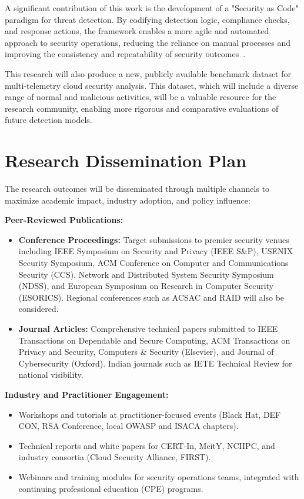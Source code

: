 A significant contribution of this work is the development of a "Security as Code" paradigm for threat detection. By codifying detection logic, compliance checks, and response actions, the framework enables a more agile and automated approach to security operations, reducing the reliance on manual processes and improving the consistency and repeatability of security outcomes~\cite{security_as_code_2024}.

This research will also produce a new, publicly available benchmark dataset for multi-telemetry cloud security analysis. This dataset, which will include a diverse range of normal and malicious activities, will be a valuable resource for the research community, enabling more rigorous and comparative evaluations of future detection models.

\section{Research Dissemination Plan}\label{sec:intro-dissemination}
The research outcomes will be disseminated through multiple channels to maximize academic impact, industry adoption, and policy influence:

\textbf{Peer-Reviewed Publications:}
\begin{itemize}
    \item \textbf{Conference Proceedings:} Target submissions to premier security venues including IEEE Symposium on Security and Privacy (IEEE S\&P), USENIX Security Symposium, ACM Conference on Computer and Communications Security (CCS), Network and Distributed System Security Symposium (NDSS), and European Symposium on Research in Computer Security (ESORICS). Regional conferences such as ACSAC and RAID will also be considered.
    \item \textbf{Journal Articles:} Comprehensive technical papers submitted to IEEE Transactions on Dependable and Secure Computing, ACM Transactions on Privacy and Security, Computers \& Security (Elsevier), and Journal of Cybersecurity (Oxford). Indian journals such as IETE Technical Review for national visibility.
\end{itemize}

\textbf{Industry and Practitioner Engagement:}
\begin{itemize}
    \item Workshops and tutorials at practitioner-focused events (Black Hat, DEF CON, RSA Conference, local OWASP and ISACA chapters).
    \item Technical reports and white papers for CERT-In, MeitY, NCIIPC, and industry consortia (Cloud Security Alliance, FIRST).
    \item Webinars and training modules for security operations teams, integrated with continuing professional education (CPE) programs.
\end{itemize}

